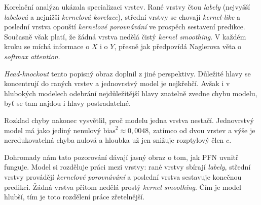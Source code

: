 Korelační analýza ukázala specializaci vrstev.
Rané vrstvy čtou \emph{labely} (nejvyšší \emph{labelová} a nejnižší \emph{kernelová korelace}), střední vrstvy se chovají \emph{kernel-like} a poslední vrstva opouští \emph{kernelové porovnávání} ve prospěch sestavení predikce.
Současně však platí, že žádná vrstva nedělá čistý \emph{kernel smoothing}.
V každém kroku se míchá informace o $X$ i o $Y$, přesně jak předpovídá Naglerova věta o \emph{softmax attention}.
\par

\emph{Head-knockout} tento popisný obraz doplnil z jiné perspektivy.
Důležité hlavy se koncentrují do raných vrstev a jednovrstvý model je nejkřehčí.
Avšak i v hlubokých modelech odebrání nejdůležitější hlavy znatelně zvedne chybu modelu, byť se tam najdou i hlavy postradatelné.
\par

Rozklad chyby nakonec vysvětlil, proč modelu jedna vrstva nestačí.
Jednovrstvý model má jako jediný nenulový $\text{bias}^2 \approx 0{,}0048$, zatímco od dvou vrstev a výše je neredukovatelná chyba nulová a hloubka už jen snižuje rozptylový člen $c$.
\par

Dohromady nám tato pozorování dávají jasný obraz o tom, jak PFN uvnitř funguje.
Model si rozděluje práci mezi vrstvy: rané vrstvy sbírají \emph{labely}, střední vrstvy provádějí \emph{kernelové porovnávání} a poslední vrstva sestavuje konečnou predikci.
Žádná vrstva přitom nedělá prostý \emph{kernel smoothing}.
Čím je model hlubší, tím je toto rozdělení práce zřetelnější.
